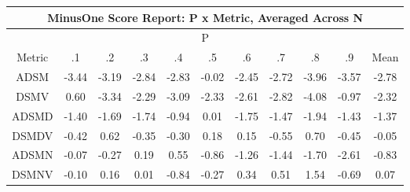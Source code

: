 \begin{longtable}{ | c || c | c | c | c | c | c | c | c | c || c |}
\hline
\multicolumn{11}{|c|}{ MinusOne Score Report: P x Metric, Averaged Across N } \\
\hline
\multicolumn{11}{|c|}{ P } \\
\hline
Metric & .1 & .2 & .3 & .4 & .5 & .6 & .7 & .8 & .9 & Mean\\
\hline
\hline
\endhead
ADSM &  \cellcolor[HTML]{FFA7A7} -3.44 &  \cellcolor[HTML]{FFAFAF} -3.19 &  \cellcolor[HTML]{FFB7B7} -2.84 &  \cellcolor[HTML]{FFB7B7} -2.83 &  \cellcolor[HTML]{FFFFFF} -0.02 &  \cellcolor[HTML]{FFBFBF} -2.45 &  \cellcolor[HTML]{FFB7B7} -2.72 &  \cellcolor[HTML]{FF9F9F} -3.96 &  \cellcolor[HTML]{FFA7A7} -3.57 &  \cellcolor[HTML]{FFB7B7} -2.78 \\
DSMV &  \cellcolor[HTML]{EFEFFF} 0.60 &  \cellcolor[HTML]{FFA7A7} -3.34 &  \cellcolor[HTML]{FFC7C7} -2.29 &  \cellcolor[HTML]{FFAFAF} -3.09 &  \cellcolor[HTML]{FFC7C7} -2.33 &  \cellcolor[HTML]{FFBFBF} -2.61 &  \cellcolor[HTML]{FFB7B7} -2.82 &  \cellcolor[HTML]{FF9797} -4.08 &  \cellcolor[HTML]{FFE7E7} -0.97 &  \cellcolor[HTML]{FFC7C7} -2.32 \\
ADSMD &  \cellcolor[HTML]{FFDFDF} -1.40 &  \cellcolor[HTML]{FFD7D7} -1.69 &  \cellcolor[HTML]{FFD7D7} -1.74 &  \cellcolor[HTML]{FFE7E7} -0.94 &  \cellcolor[HTML]{FFFFFF} 0.01 &  \cellcolor[HTML]{FFCFCF} -1.75 &  \cellcolor[HTML]{FFD7D7} -1.47 &  \cellcolor[HTML]{FFCFCF} -1.94 &  \cellcolor[HTML]{FFD7D7} -1.43 &  \cellcolor[HTML]{FFDFDF} -1.37 \\
DSMDV &  \cellcolor[HTML]{FFF7F7} -0.42 &  \cellcolor[HTML]{EFEFFF} 0.62 &  \cellcolor[HTML]{FFF7F7} -0.35 &  \cellcolor[HTML]{FFF7F7} -0.30 &  \cellcolor[HTML]{F7F7FF} 0.18 &  \cellcolor[HTML]{FFFFFF} 0.15 &  \cellcolor[HTML]{FFEFEF} -0.55 &  \cellcolor[HTML]{EFEFFF} 0.70 &  \cellcolor[HTML]{FFF7F7} -0.45 &  \cellcolor[HTML]{FFFFFF} -0.05 \\
ADSMN &  \cellcolor[HTML]{FFFFFF} -0.07 &  \cellcolor[HTML]{FFF7F7} -0.27 &  \cellcolor[HTML]{F7F7FF} 0.19 &  \cellcolor[HTML]{EFEFFF} 0.55 &  \cellcolor[HTML]{FFE7E7} -0.86 &  \cellcolor[HTML]{FFDFDF} -1.26 &  \cellcolor[HTML]{FFD7D7} -1.44 &  \cellcolor[HTML]{FFD7D7} -1.70 &  \cellcolor[HTML]{FFBFBF} -2.61 &  \cellcolor[HTML]{FFE7E7} -0.83 \\
DSMNV &  \cellcolor[HTML]{FFFFFF} -0.10 &  \cellcolor[HTML]{FFFFFF} 0.16 &  \cellcolor[HTML]{FFFFFF} 0.01 &  \cellcolor[HTML]{FFE7E7} -0.84 &  \cellcolor[HTML]{FFF7F7} -0.27 &  \cellcolor[HTML]{F7F7FF} 0.34 &  \cellcolor[HTML]{EFEFFF} 0.51 &  \cellcolor[HTML]{D7D7FF} 1.54 &  \cellcolor[HTML]{FFEFEF} -0.69 &  \cellcolor[HTML]{FFFFFF} 0.07 \\

\end{longtable}
